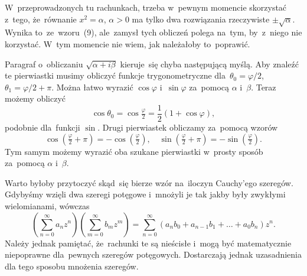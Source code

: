 \documentclass[a4paper,11pt]{article}
\numberwithin{equation}{section}
\begin{document}
\VerSpaceFour





\noindent
{} W~przeprowadzonych tu rachunkach, trzeba w~pewnym momencie
skorzystać z~tego, że~równanie $x^{ 2 } = \alpha$, $\alpha > 0$ ma tylko dwa
rozwiązania rzeczywiste $\pm \sqrt{ \alpha }$. Wynika to~ze~wzoru~(9), ale~zamysł
tych obliczeń polega na~tym, by~z~niego nie korzystać. W~tym momencie nie
wiem, jak należałoby to~poprawić.

\VerSpaceFour





\noindent
{} Paragraf o~obliczaniu $\sqrt{ \alpha + i \beta }$ kieruje~się chyba
następującą myślą. Aby znaleźć te pierwiastki musimy obliczyć funkcje
trygonometryczne dla~$\theta_{ 0 } = \varphi / 2$, $\theta_{ 1 } = \varphi / 2 + \pi$. Można łatwo
wyrazić $\cos \varphi$ i~$\sin \varphi$ za~pomocą $\alpha$ i~$\beta$. Teraz możemy obliczyć
\begin{equation}
  \label{eq:Leja-Funkcje-zespolone-11}
  \cos \theta_{ 0 } = \cos \tfrac{ \varphi }{ 2 } = \frac{ 1 }{ 2 } ( 1 + \cos \varphi ),
\end{equation}
podobnie dla~funkcji $\sin$. Drugi pierwiastek obliczamy za~pomocą
wzorów
\begin{equation}
  \label{eq:Leja-Funkcje-zespolone-12}
  \cos( \tfrac{ \varphi }{ 2 } + \pi ) = -\cos( \tfrac{ \varphi }{ 2 } ), \quad
  \sin( \tfrac{ \varphi }{ 2 } + \pi ) = -\sin( \tfrac{ \varphi }{ 2 } ).
\end{equation}
Tym samym możemy wyrazić oba szukane pierwiastki w~prosty sposób
za~pomocą $\alpha$ i~$\beta$.

\VerSpaceFour





\noindent
{} Warto byłoby przytoczyć skąd~się bierze wzór na~iloczyn
Cauchy’ego szeregów. Gdybyśmy wzięli dwa szeregi potęgowe i~mnożyli je tak
jakby były zwykłymi wielomianami, wówczas
\begin{equation}
  \label{eq:Leja-Funkcje-zespolone-13}
  \left( \sum_{ n = 0 }^{ \infty } a_{ n } z^{ n } \right)
  \left( \sum_{ m = 0 }^{ \infty } b_{ m } z^{ m } \right) =
  \sum_{ n = 0 }^{ \infty } ( a_{ n } b_{ 0 } + a_{ n - 1 } b_{ 1 } + \ldots +
  a_{ 0 } b_{ n } ) z^{ n }.
\end{equation}
Należy jednak pamiętać, że~rachunki te są nieścisłe i~mogą być
matematycznie niepoprawne dla~pewnych szeregów potęgowych. Dostarczają
jednak uzasadnienia dla tego sposobu mnożenia szeregów.
\end{document}
